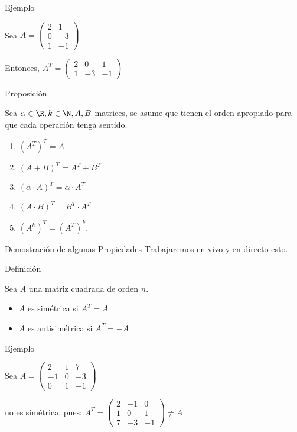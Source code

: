 {Ejemplo}


Sea $A=
\left(
\begin{array}{cc}
2 &  1  \\
0 & -3 \\
1 & -1
\end{array}
\right)
$

Entonces,
 $A^T=
\left(
\begin{array}{ccc}
2 &  0 & 1  \\
1 & - 3  & -1
\end{array}
\right)
$

{Proposición}

Sea $\alpha \in \R, k \in \N, A, B$ 
matrices,  se asume que tienen el orden  apropiado para que cada operación tenga sentido.

\begin{enumerate}
\item
$(A^T)^T = A$

\item
$(A+B)^T = A^T  + B^T $

\item
$(\alpha \cdot A)^T = \alpha \cdot A^T $

\item
$(A \cdot B)^T = B^T \cdot  A^T   $

\item
$(A ^k)^T = (A ^T)^k   $.
\end{enumerate}

{Demostración de algunas Propiedades}
Trabajaremos  en vivo y en directo esto.


{Definición}

Sea $A$ una matriz cuadrada de orden $n$.

\begin{itemize}
\item
$A$ es simétrica si $A^T = A   $

\item
$A$ es antisimétrica si $A^T = - A   $

\end{itemize}


{Ejemplo}

Sea $A=
\left(
\begin{array}{ccc}
2 &  1  &  7 \\
-1 &  0 &  -3 \\
0  &  1 & -1
\end{array}
\right)
$

no es simétrica, pues:
$A^T=
\left(
\begin{array}{ccc}
2  &  -1  &  0 \\
1  &  0   &  1 \\
7  &  -3  & -1
\end{array}
\right)
\neq  A$


